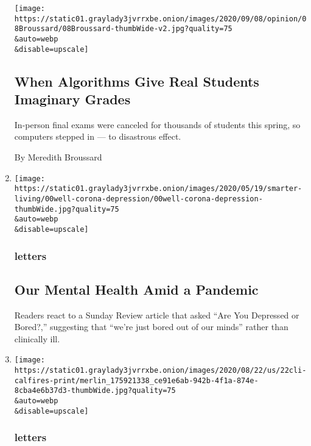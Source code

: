 \begin{enumerate}
  \texttt{[image: https://static01.graylady3jvrrxbe.onion/images/2020/09/08/opinion/08Broussard/08Broussard-thumbWide-v2.jpg?quality=75\\\&auto=webp\\\&disable=upscale]}

  \hypertarget{when-algorithms-give-real-students-imaginary-grades}{%
  \subsection{When Algorithms Give Real Students Imaginary
  Grades}\label{when-algorithms-give-real-students-imaginary-grades}}

  In-person final exams were canceled for thousands of students this
  spring, so computers stepped in --- to disastrous effect.

  By Meredith Broussard
\item
  \href{/2020/09/07/opinion/letters/coronavirus-mental-health.html}{}

  \texttt{[image: https://static01.graylady3jvrrxbe.onion/images/2020/05/19/smarter-living/00well-corona-depression/00well-corona-depression-thumbWide.jpg?quality=75\\\&auto=webp\\\&disable=upscale]}

  \hypertarget{letters}{%
  \subsubsection{letters}\label{letters}}

  \hypertarget{our-mental-health-amid-a-pandemic}{%
  \subsection{Our Mental Health Amid a
  Pandemic}\label{our-mental-health-amid-a-pandemic}}

  Readers react to a Sunday Review article that asked ``Are You
  Depressed or Bored?,'' suggesting that ``we're just bored out of our
  minds'' rather than clinically ill.
\item
  \href{/2020/09/07/opinion/letters/forests-wildfires-climate.html}{}

  \texttt{[image: https://static01.graylady3jvrrxbe.onion/images/2020/08/22/us/22cli-calfires-print/merlin\_175921338\_ce91e6ab-942b-4f1a-874e-8cba4e6b37d3-thumbWide.jpg?quality=75\\\&auto=webp\\\&disable=upscale]}

  \hypertarget{letters-1}{%
  \subsubsection{letters}\label{letters-1}}


\end{enumerate}
